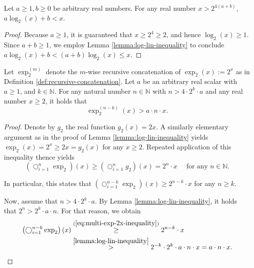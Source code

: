 \begin{corollary}
	\label{cor:log-lin-add-inequality}
	Let $a\geq 1,b\geq 0$ be arbitrary real numbers.
	For any real number $x> 2^{4(a+b)}$, $a\log_2(x)+b < x$.
\end{corollary}
\begin{proof}
	Because $a\geq 1$, it is guaranteed that $x\geq 2^4 \geq 2$, and hence $\log_2(x)\geq 1$. 
	Since $a+b\geq 1$, we employ Lemma \ref{lemma:log-lin-inequality} to conclude $a\log_2(x)+b < (a+b)\log_2(x)\leq x$.
\end{proof}

\begin{lemma}
	\label{lemma:cascade-exp-inequality}
	Let $\exp_2^{(m)}$ denote the $m$-wise recursive concatenation of $\exp_2(x):=2^x$ as in Definition \ref{def:recursive-concatenation}.
	Let $a$ be an arbitrary real scalar with $a\geq 1$, and $k\in\mathbb{N}$. 
	For any natural number $n\in\mathbb{N}$ with $n>4\cdot 2^k\cdot a$ and any real number $x\geq 2$, it holds that
	\begin{equation}
		\exp_2^{(n-k)}(x) > a\cdot n \cdot x.
	\end{equation}
\end{lemma}
\begin{proof}
	Denote by $g_2$ the real function $g_2(x)=2x$.
	A similarly elementary argument as in the proof of Lemma \ref{lemma:log-lin-inequality} yields $\exp_2(x)=2^x\geq 2x=g_2(x)$ for any $x\geq 2$.
	Repeated application of this inequality thence yields 
	\begin{equation}
		\label{eq:multi-exp-2x-inequality}
		\left(\bigcirc_{i=1}^n\exp_2\right)(x) \geq \left(\bigcirc_{i=1}^n g_2\right)(x)= 2^n\cdot x \quad \text{ for any } n\in\mathbb{N}.
	\end{equation}
	
	In particular, this states that $\left(\bigcirc_{i=1}^{n-k}\exp_2\right)(x) \geq 2^{n-k}\cdot x$ for any $n\geq k$.
	
	Now, assume that $n>4\cdot 2^k\cdot a$.
	By Lemma \ref{lemma:log-lin-inequality}, it holds that $2^n> 2^k\cdot a\cdot n$.
	For that reason, we obtain
	\begin{align}
		\label{eq:cascade-exp-inequality}
		\left(\bigcirc_{i=1}^{n-k}\exp_2\right)(x) &\overset{(\ref{eq:multi-exp-2x-inequality})}{\geq} 2^{n-k}\cdot x\\
		&\overset{\ref{lemma:log-lin-inequality}}{>} 2^{-k}\cdot 2^k\cdot a\cdot n \cdot x = a\cdot n\cdot x.
	\end{align}
	
\end{proof}
